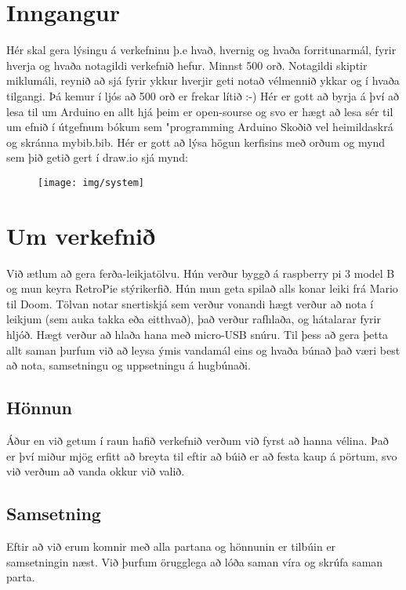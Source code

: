 \section{Inngangur}
Hér skal gera lýsingu á verkefninu þ.e hvað,  hvernig og  hvaða forritunarmál, fyrir hverja og hvaða notagildi verkefnið hefur. Minnst 500 orð. Notagildi skiptir miklumáli, reynið að sjá fyrir ykkur hverjir geti notað vélmennið ykkar og í hvaða tilgangi.  Þá kemur í ljós að 500 orð er frekar lítið :-) Hér er gott að byrja á því að lesa til um Arduino en allt hjá þeim er open-sourse og svo er hægt að lesa sér til um efnið í útgefnum bókum sem "programming Arduino \cite{monk} Skoðið vel heimildaskrá og skránna mybib.bib. Hér er gott að lýsa högun kerfisins með orðum og mynd sem þið getið gert í draw.io sjá mynd:

\begin{figure}[h]
\texttt{[image: img/system]}
\end{figure}
\section{Um verkefnið}
Við ætlum að gera ferða-leikjatölvu. Hún verður byggð á raspberry pi 3 model B og mun keyra RetroPie stýrikerfið. Hún mun geta spilað alls konar leiki frá Mario til Doom. Tölvan notar snertiskjá sem verður vonandi hægt verður að nota í leikjum (sem auka takka eða eitthvað), það verður rafhlaða, og hátalarar fyrir hljóð. Hægt verður að hlaða hana með micro-USB snúru. Til þess að gera þetta allt saman þurfum við að leysa ýmis vandamál eins og hvaða búnað það væri best að nota, samsetningu og uppsetningu á hugbúnaði.

\subsection{Hönnun}

Áður en við getum í raun hafið verkefnið verðum við fyrst að hanna vélina. Það er því miður mjög erfitt að breyta til eftir að búið er að festa kaup á pörtum, svo við verðum að vanda okkur við valið.

\subsection{Samsetning}

Eftir að við erum komnir með alla partana og hönnunin er tilbúin er samsetningin næst. Við þurfum örugglega að lóða saman víra og skrúfa saman parta.

